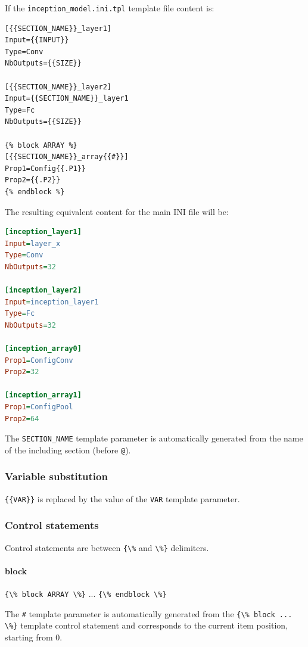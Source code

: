\documentclass[a4paper,11pt,oneside]{article}
\begin{document}
If the \lstinline!inception_model.ini.tpl! template file content is:

\begin{lstlisting}[language=tpl]
[{{SECTION_NAME}}_layer1]
Input={{INPUT}}
Type=Conv
NbOutputs={{SIZE}}

[{{SECTION_NAME}}_layer2]
Input={{SECTION_NAME}}_layer1
Type=Fc
NbOutputs={{SIZE}}

{% block ARRAY %}
[{{SECTION_NAME}}_array{{#}}]
Prop1=Config{{.P1}}
Prop2={{.P2}}
{% endblock %}
\end{lstlisting}

The resulting equivalent content for the main INI file will be:

\begin{lstlisting}[language=ini]
[inception_layer1]
Input=layer_x
Type=Conv
NbOutputs=32

[inception_layer2]
Input=inception_layer1
Type=Fc
NbOutputs=32

[inception_array0]
Prop1=ConfigConv
Prop2=32

[inception_array1]
Prop1=ConfigPool
Prop2=64
\end{lstlisting}

The \lstinline!SECTION_NAME! template parameter is automatically generated from
the name of the including section (before \lstinline!@!).


\subsubsection{Variable substitution}

\lstinline!{{VAR}}! is replaced by the value of the \lstinline!VAR! template
 parameter.


\subsubsection{Control statements}

Control statements are between \lstinline!{\%! and \lstinline!\%}! delimiters.

\paragraph{block}
\lstinline!{\% block ARRAY \%}! ...
\lstinline!{\% endblock \%}!

The \lstinline!#! template parameter is automatically generated from the
\lstinline!{\% block ... \%}! template control statement and corresponds to the
current item position, starting from 0.
\end{document}
